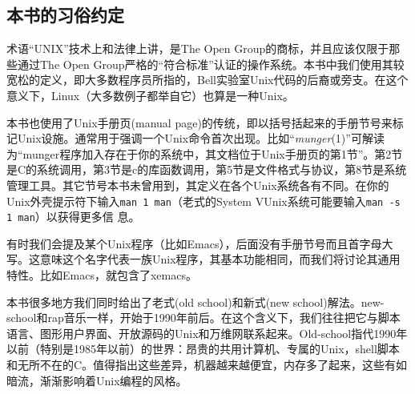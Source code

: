 \documentclass[12pt,oneside]{ctexbook}
\begin{document}
\begin{common-format}
{\section{本书的习俗约定}
术语“UNIX”技术上和法律上讲，是The Open Group的商标，并且应该仅限于那些通过The Open Group严格的“符合标准”认证的操作系统。本书中我们使用其较宽松的定义，即大多数程序员所指的，Bell实验室Unix代码的后裔或旁支。在这个意义下，Linux（大多数例子都举自它）也算是一种Unix。

本书也使用了Unix手册页(manual page)的传统，即以括号括起来的手册节号来标记Unix设施。通常用于强调一个Unix命令首次出现。比如“\textit{munger}(1)”可解读为“munger程序加入存在于你的系统中，其文档位于Unix手册页的第1节”。第2节是C的系统调用，第3节是c的库函数调用，第5节是文件格式与协议，第8节是系统管理工具。其它节号本书未曾用到，其定义在各个Unix系统各有不同。在你的Unix外壳提示符下输入\verb+man 1 man+（老式的System VUnix系统可能要输入\verb+man -s 1 man+）以获得更多信
息。

有时我们会提及某个Unix程序（比如Emacs），后面没有手册节号而且首字母大写。这意味这个名字代表一族Unix程序，其基本功能相同，而我们将讨论其通用特性。比如Emacs，就包含了xemacs。

本书很多地方我们同时给出了老式(old school)和新式(new school)解法。new-school和rap音乐一样，开始于1990年前后。在这个含义下，我们往往把它与脚本语言、图形用户界面、开放源码的Unix和万维网联系起来。Old-school指代1990年以前（特别是1985年以前）的世界：昂贵的共用计算机、专属的Unix，shell脚本和无所不在的C。值得指出这些差异，机器越来越便宜，内存多了起来，这些有如暗流，渐渐影响着Unix编程的风格。

}
\end{common-format}
\end{document}
